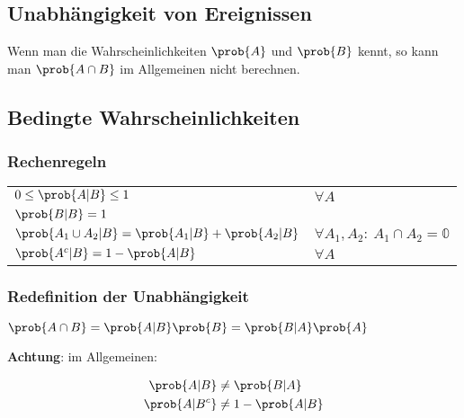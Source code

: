 \documentclass[8pt,a4paper]{scrartcl}
\begin{document}
\begin{multicols*}{3}

\subsection{Unabhängigkeit von Ereignissen}

Wenn man die Wahrscheinlichkeiten $\prob{A}$ und $\prob{B}$ kennt, so kann man $\prob{A\cap B}$ im Allgemeinen nicht berechnen.


\subsection{Bedingte Wahrscheinlichkeiten}


\subsubsection{Rechenregeln}

\begin{tabular}{ll}
$0\leq\prob{A|B}\leq 1$&$\forall A$\\
$\prob{B|B}=1$&\\
$\prob{A_1\cup A_2|B}=\prob{A_1|B}+\prob{A_2|B}$&$\forall A_1,A_2:\ A_1\cap A_2=\mathbb{0}$\\
$\prob{A^c|B}=1-\prob{A|B}$&$\forall A$
\end{tabular}

\subsubsection{Redefinition der Unabhängigkeit}

$\prob{A\cap B}=\prob{A|B}\prob{B}=\prob{B|A}\prob{A}$


\textbf{Achtung}: im Allgemeinen:

\begin{align*}
\prob{A|B} &\neq \prob{B|A}\\
\prob{A|B^c}&\neq 1-\prob{A|B}
\end{align*}


\end{multicols*}
\end{document}
